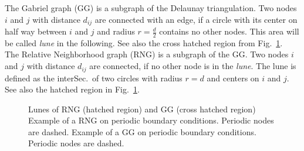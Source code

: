     The Gabriel graph (GG) \cite{Gabriel1969} is a subgraph of the
    Delaunay triangulation. Two nodes \(i\) and \(j\) with distance
    \(d_{ij}\) are connected with an edge, if a circle with its
    center on half way between \(i\) and \(j\) and radius
    \(r = \frac d 2\) contains no other nodes. This area will be
    called \emph{lune} in the following. See also the cross hatched region
    from Fig.\ \ref{fig:lunes}.\\
    The Relative Neighborhood graph (RNG) \cite{Toussaint1980} is a
    subgraph of the GG. Two nodes \(i\) and \(j\) with
    distance \(d_{ij}\) are connected, if no other node is in the
    \emph{lune}. The lune is defined as the interSec.\ of two
    circles with radius \(r = d\) and centers on \(i\) and \(j\).
    See also the hatched region in Fig.\ \ref{fig:lunes}.
    \begin{figure}[htbp]
        \centering
        \caption[Gabriel - and Relative Neighborhood Graph]
        {
             Lunes of RNG (hatched region) and
                GG (cross hatched region)
             Example of a RNG on periodic
                boundary conditions. Periodic nodes are dashed.
             Example of a GG on
                periodic boundary conditions. Periodic nodes are dashed.
        }
        \label{fig:lunes}
    \end{figure}\\
